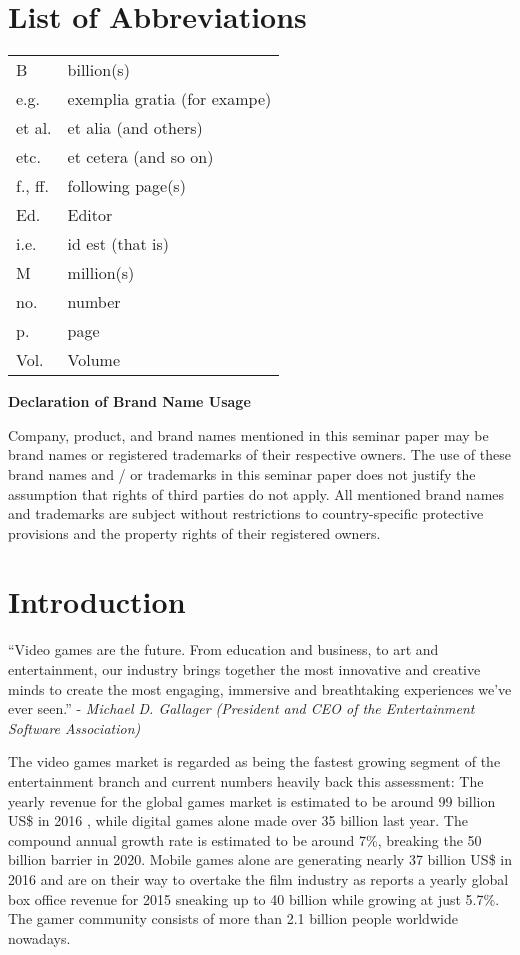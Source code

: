 \documentclass
[
    a4paper,
    11pt
]
{article}
\begin{document}
\section*{List of Abbreviations}
\begin{tabular}{ll}
    B       & billion(s)\\
	  e.g.	  & 	exemplia gratia (for exampe) \\
    et al.  &   et alia (and others)\\
    etc.    &   et cetera (and so on)\\
    f., ff. &   following page(s)\\
    Ed.   	&   Editor\\
    i.e.    &   id est  (that is)\\
    M     	&   million(s)\\
    no.		&   number \\
    p.  	&	page\\
    Vol.    &   Volume \\
\end{tabular}

\textbf{Declaration of Brand Name Usage}

Company, product, and brand names mentioned in this seminar paper may be brand
names or registered trademarks of their respective owners. The use of these brand
names and / or trademarks in this seminar paper does not justify the assumption
that rights of third parties do not apply. All mentioned brand names and trademarks
are subject without restrictions to country-specific protective provisions and the
property rights of their registered owners.
\clearpage
%
%
\listoffigures
{}
\clearpage
%
 \setcounter{page}{1}
%
\onehalfspacing
\section{Introduction}
\label{introduction}
%
``Video games are the future. From education and business, to art and
entertainment, our industry brings together the most innovative and
creative minds to create the most engaging, immersive and breathtaking
experiences we've ever seen.'' - \emph{Michael D. Gallager (President
and CEO of the Entertainment Software Association)}

The video games market is regarded as being the fastest growing segment
of the entertainment branch \cite{Hennig-Thurau2013} and current numbers
heavily back this assessment: The yearly revenue for the global games
market is estimated to be around 99 billion US\$ in
2016 \cite{NewZoo2016}, while digital games alone made over 35 billion \EUR{}
 last year. The compound annual growth rate is
estimated to be around 7\%, breaking the 50 billion \EUR{} barrier in
2020. \cite{Statista2016a} Mobile games alone are generating nearly 37
billion US\$ in 2016 and are on their way to overtake the film industry
as \cite{PWC2015} reports a yearly global box office revenue for 2015
sneaking up to 40 billion \EUR{} while growing at just 5.7\%. The gamer
community consists of more than 2.1 billion people worldwide nowadays.
\cite{NewZoo2016}
\end{document}
